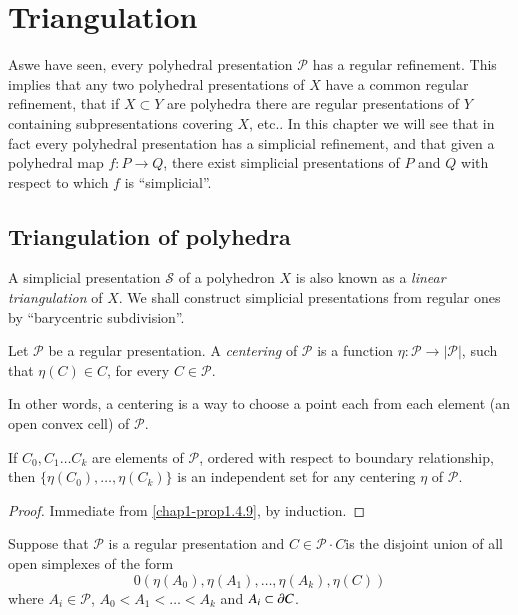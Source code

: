 
\chapter{Triangulation}\label{chap2}

As\pageoriginale we have seen, every polyhedral presentation $\mathscr{P}$ has a regular refinement. This implies that any two polyhedral presentations of $X$ have a common regular refinement, that if $X\subset Y$ are polyhedra there are regular presentations of $Y$ containing subpresentations covering $X$, etc.. In this chapter we will see that in fact every polyhedral presentation has a simplicial refinement, and that given a polyhedral map $f:P\to Q$, there exist simplicial presentations of $P$ and $Q$ with respect to which $f$ is ``simplicial''.

\section{Triangulation of polyhedra}\label{chap2-sec2.1}

A simplicial presentation $\mathscr{S}$ of a polyhedron $X$ is also known as a {\em linear triangulation} of $X$. We shall construct simplicial presentations from regular ones by ``barycentric subdivision''.

\begin{definition}\label{chap2-defi2.1.1}
Let $\mathscr{P}$ be a regular presentation. A {\em centering} of $\mathscr{P}$ is a function $\eta:\mathscr{P}\to |\mathscr{P}|$, such that $\eta(C)\in C$, for every $C\in \mathscr{P}$.
\end{definition}

In other words, a centering is a way to choose a point each from each element (an open convex cell) of $\mathscr{P}$.

\begin{proposition}\label{chap2-prop2.1.2}
If $C_{0},C_{1}\ldots C_{k}$ are elements of $\mathscr{P}$, ordered with respect to boundary relationship, then $\{\eta(C_{0}),\ldots,\eta(C_{k})\}$ is an independent set for any centering $\eta$ of $\mathscr{P}$.
\end{proposition}

\begin{proof}
Immediate from \ref{chap1-prop1.4.9}, by induction.
\end{proof}

\begin{proposition}\label{chap2-prop2.1.3}
Suppose that $\mathscr{P}$ is a regular presentation and 
$C\in\mathscr{P}\cdot C$\pageoriginale is the disjoint union of all open simplexes of the form
$$
0(\eta(A_{0}), \eta(A_{1}),\ldots,\eta(A_{k}),\eta(C))
$$
where $A_{i}\in \mathscr{P}$, $A_{0}<A_{1}<\ldots<A_{k}$ and $A_{i}\subset \partial C$.
\end{proposition}

